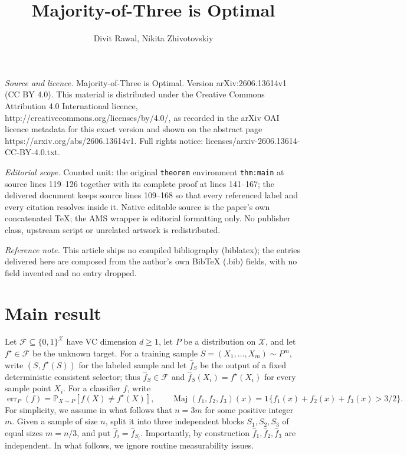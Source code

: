 \documentclass[10pt,a4paper]{amsart}
\newcommand{\X}{\mathcal X}
\newcommand{\F}{\mathcal F}
\newcommand{\Prb}{\mathbb P}
\newcommand{\1}{\mathbf 1}
\newcommand{\err}{\operatorname{err}}
\newcommand{\Maj}{\operatorname{Maj}}
\begin{document}
\title[Majority-of-Three is Optimal]{Majority-of-Three is Optimal}
\author{Divit Rawal, Nikita Zhivotovskiy}
\date{}
\maketitle
\noindent\emph{Source and licence.} Majority-of-Three is Optimal. Version arXiv:2606.13614v1 (CC BY 4.0). This material is distributed under the Creative Commons Attribution 4.0 International licence, http://creativecommons.org/licenses/by/4.0/, as recorded in the arXiv OAI licence metadata for this exact version and shown on the abstract page https://arxiv.org/abs/2606.13614v1. Full rights notice: licenses/arxiv-2606.13614-CC-BY-4.0.txt.\par\smallskip
\noindent\textit{Editorial scope.} Counted unit: the original \texttt{theorem} environment \texttt{thm:main} at source lines 119--126 together with its complete proof at lines 141--167; the delivered document keeps source lines 109--168 so that every referenced label and every citation resolves inside it. Native editable source is the paper's own concatenated TeX; the AMS wrapper is editorial formatting only. No publisher class, upstream script or unrelated artwork is redistributed.
\par\smallskip\noindent\textit{Reference note.} This article ships no compiled bibliography (biblatex); the entries delivered here are composed from the author's own BibTeX (.bib) fields, with no field invented and no entry dropped.
\section{Main result}

Let $\F\subseteq\{0,1\}^{\X}$ have VC dimension $d\ge 1$, let $P$ be a distribution on $\X$, and let $f^\star\in\F$ be the unknown target.  For a training sample $S=(X_1,\ldots,X_m)\sim P^m$, write $(S,f^\star(S))$ for the labeled sample and let $\widehat f_S$ be the output of a fixed deterministic consistent selector; thus $\widehat f_S\in\F$ and $\widehat f_S(X_i)=f^\star(X_i)$ for every sample point $X_i$.  For a classifier $f$, write
\[
\err_P(f)=\Prb_{X\sim P}\left[f(X)\ne f^\star(X)\right],
\qquad
\Maj(f_1,f_2,f_3)(x)=\1\{f_1(x)+f_2(x)+f_3(x)>3/2\}.
\]
For simplicity, we assume in what follows that $n = 3m$ for some positive integer $m$. Given a sample of size $n$, split it into three independent blocks $S_1,S_2,S_3$ of equal sizes $m = n/3$, and put $\widehat f_i=\widehat f_{S_i}$.  Importantly, by construction $\widehat f_1, \widehat f_2, \widehat f_3$ are independent. In what follows, we ignore routine measurability issues. 
\end{document}
